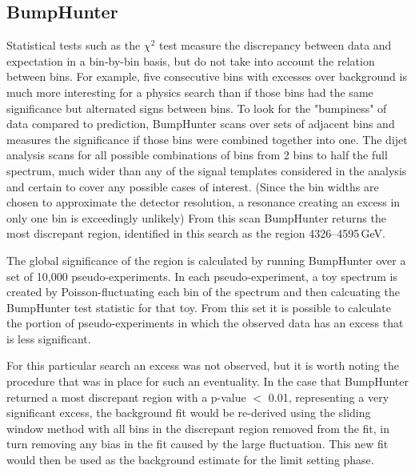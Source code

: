 \subsection{BumpHunter}

Statistical tests such as the $\chi^2$ test measure the discrepancy between data and expectation in a bin-by-bin basis, but do not take into account the relation between bins.  For example, five consecutive bins with excesses over background is much more interesting for a physics search than if those bins had the same significance but alternated signs between bins.  To look for the "bumpiness" of data compared to prediction, BumpHunter scans over sets of adjacent bins and measures the significance if those bins were combined together into one.  The dijet analysis scans for all possible combinations of bins from 2 bins to half the full spectrum, much wider than any of the signal templates considered in the analysis and certain to cover any possible cases of interest.  (Since the bin widths are chosen to approximate the detector resolution, a resonance creating an excess in only one bin is exceedingly unlikely)  From this scan BumpHunter returns the most discrepant region, identified in this search as the region 4326–4595\,GeV.

The global significance of the region is calculated by running BumpHunter over a set of 10,000 pseudo-experiments.  In each pseudo-experiment, a toy spectrum is created by Poisson-fluctuating each bin of the spectrum and then calcuating the BumpHunter test statistic for that toy.  From this set it is possible to calculate the portion of pseudo-experiments in which the observed data has an excess that is less significant.

For this particular search an excess was not observed, but it is worth noting the procedure that was in place for such an eventuality.  In the case that BumpHunter returned a most discrepant region with a p-value $<$ 0.01, representing a very significant excess, the background fit would be re-derived using the sliding window method with all bins in the discrepant region removed from the fit, in turn removing any bias in the fit caused by the large fluctuation.  This new fit would then be used as the background estimate for the limit setting phase.